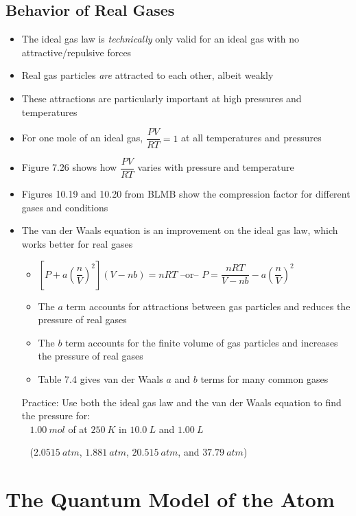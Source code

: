\documentclass[12pt, openany, letterpaper]{memoir}
\begin{document}
\section{Behavior of Real Gases}
\begin{itemize}
	\item The ideal gas law is \emph{technically} only valid for an ideal gas with no attractive/repulsive forces
	\item Real gas particles \emph{are} attracted to each other, albeit weakly
	\item These attractions are particularly important at high pressures and temperatures
	\item For one mole of an ideal gas, $\dfrac{PV}{RT}=1$ at all temperatures and pressures
	\item Figure 7.26 shows how $\dfrac{PV}{RT}$ varies with pressure and temperature
	\item Figures 10.19 and 10.20 from BLMB show the compression factor for different gases and conditions
	\item The van der Waals equation is an improvement on the ideal gas law, which works better for real gases
	      \begin{itemize}
		      \item $\left[P+a\left(\dfrac{n}{V}\right)^2\right]\left(V-nb\right)=nRT$ \hspace{1em} --or-- \hspace{1em} $P=\dfrac{nRT}{V-nb}-a\left(\dfrac{n}{V}\right)^2$
		      \item The $a$ term accounts for attractions between gas particles and reduces the pressure of real gases
		      \item The $b$ term accounts for the finite volume of gas particles and increases the pressure of real gases
		      \item Table 7.4 gives van der Waals $a$ and $b$ terms for many common gases
	      \end{itemize}
	      Practice: Use both the ideal gas law and the van der Waals equation to find the pressure for:\\
	      ~\hphantom{Practice: } $1.00~mol$ of  at $250~K$ in $10.0~L$ and $1.00~L$

	      ~\hphantom{Practice: } ($2.0515~atm$, $1.881~atm$, $20.515~atm$, and $37.79~atm$)
\end{itemize}

\chapter{The Quantum Model of the Atom}
\end{document}
